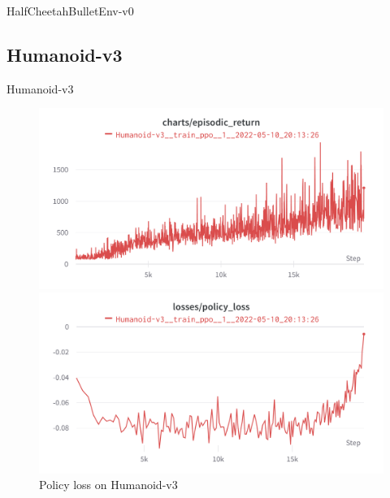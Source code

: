 \documentclass[english, xcolor=dvipsnames, aspectratio=169]{beamer}
\newcommand{\customToC}[2]
{
    \begin{frame}{Overview}
    \tableofcontents[#1,#2]
    \end{frame}
}
\begin{document}
\begin{frame}{HalfCheetahBulletEnv-v0}
\end{frame}


\subsection{Humanoid-v3}

\begin{frame}{Humanoid-v3}
    \begin{figure}[ht]
        \begin{minipage}[b]{0.32\linewidth}
            \centering
            \includegraphics[width=\textwidth]{humanoid_.png}
            \caption{Reward on Humanoid-v3}
            \label{fig:cifar10}
        \end{minipage}
        \hspace{0.5cm}
        \begin{minipage}[b]{0.32\linewidth}
            \centering
            \includegraphics[width=\textwidth]{humanoid_policy_loss.png}
            \caption{Policy loss on Humanoid-v3}
            \label{fig:cifar100}
        \end{minipage}

\end{figure}
\end{frame}
\end{document}

